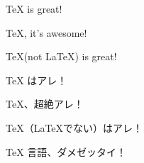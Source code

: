 \documentclass[a4paper]{jsarticle}
\newcommand\myTeX{\TeX\xspace}
\begin{document}
\myTeX is great!\par
\myTeX, it's awesome!\par
\myTeX (not \LaTeX) is great!\par
\myTeX はアレ！\par
\myTeX、超絶アレ！\par
\myTeX （\LaTeX でない）はアレ！\par
\myTeX 言語、ダメゼッタイ！\par
\end{document}
